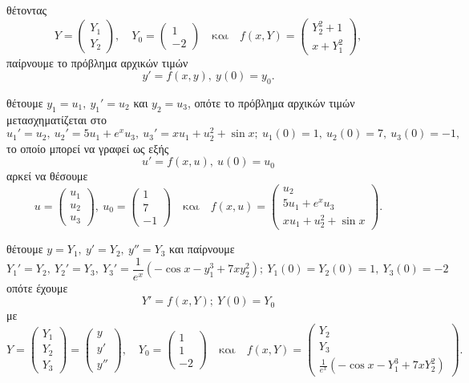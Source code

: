 \documentclass[11pt,a4paper,twoside]{book}
\begin{document}
\begin{rlist}
\item θέτοντας
\[
Y = \begin{pmatrix} Y_1 \\ Y_2 \end{pmatrix}, \quad Y_0 = \begin{pmatrix} 1 \\ -2 \end{pmatrix} \quad \text{και} \quad f(x,Y) = \begin{pmatrix} Y_2^2+1 \\ x+Y_1^2 \end{pmatrix},
\]
παίρνουμε το πρόβλημα αρχικών τιμών
\[
y' = f(x,y), \ y(0)=y_0.
\]
\item θέτουμε $y_1=u_1, \ y_1'=u_2$ και $y_2=u_3$, οπότε το πρόβλημα αρχικών τιμών μετασχηματίζεται στο
\[
u_1'=u_2, \ u_2'=5u_1+e^x u_3, \ u_3'=xu_1+u_2^2+\sin x; \ u_1(0)=1, \ u_2(0)=7, \ u_3(0)=-1,
\]
το οποίο μπορεί να γραφεί ως εξής
\[
u' = f(x,u), \ u(0)=u_0
\]
αρκεί να θέσουμε
\[
u = \begin{pmatrix} u_1 \\ u_2 \\ u_3 \end{pmatrix}, \ u_0 = \begin{pmatrix} 1 \\ 7 \\ -1 \end{pmatrix} \quad \text{και} \quad f(x,u) = \begin{pmatrix} u_2 \\ 5u_1+e^x u_3 \\ xu_1+u_2^2+\sin x \end{pmatrix}.
\]
\item θέτουμε $y=Y_1, \ y'=Y_2, \ y''=Y_3$ και παίρνουμε
\[
Y_1' = Y_2, \ Y_2' = Y_3, \ Y_3' = \frac{1}{e^x} (-\cos x - y_1^3 + 7xy_2^2); \ Y_1(0)=Y_2(0)=1, \ Y_3(0)=-2
\]
οπότε έχουμε
\[
Y' = f(x,Y); \ Y(0)=Y_0
\]
με
\[
Y = \begin{pmatrix} Y_1 \\ Y_2 \\ Y_3 \end{pmatrix} = \begin{pmatrix} y \\ y' \\ y'' \end{pmatrix}, \quad Y_0 = \begin{pmatrix} 1 \\ 1 \\ -2 \end{pmatrix} \quad \text{και} \quad f(x,Y) = \begin{pmatrix} Y_2 \\ Y_3 \\ \frac{1}{e^x}(-\cos x - Y_1^3+7xY_2^2) \end{pmatrix}.
\]
\end{rlist}
\end{document}
